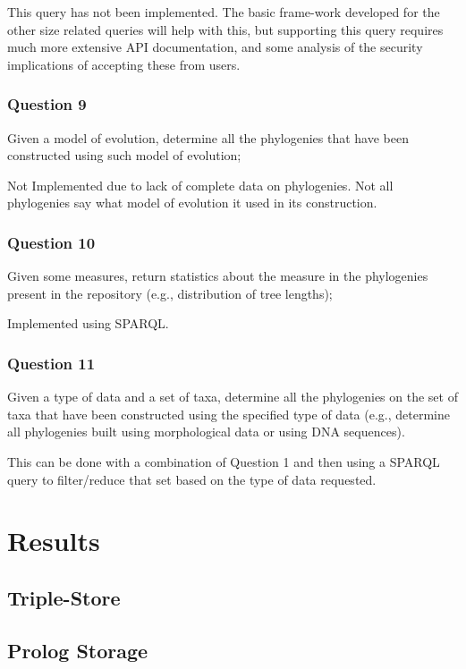 \documentclass[10pt]{article}
\begin{document}
This query has not been implemented. The basic frame-work developed for the other
size related queries will help with this, but supporting this query requires much
more extensive API documentation, and some analysis of the security implications
of accepting these from users.


\subsubsection{Question 9}
Given a model of evolution, determine all the phylogenies that have been
constructed using such model of evolution;


Not Implemented due to lack of complete data on phylogenies.  Not all
phylogenies say what model of evolution it used in its construction.

\subsubsection{Question 10}
Given some measures, return statistics about the measure in the phylogenies
present in the repository (e.g., distribution of tree lengths);


Implemented using SPARQL.

\subsubsection{Question 11}
Given a type of data and a set of taxa, determine all the phylogenies on the
set of taxa that have been constructed using the specified type of data (e.g.,
determine all phylogenies built using morphological data or using DNA
sequences).	


This can be done with a combination of Question 1 and then using a SPARQL query
to filter/reduce that set based on the type of data requested.

\section{Results}

\subsection{Triple-Store}

\subsection{Prolog Storage}
\end{document}
